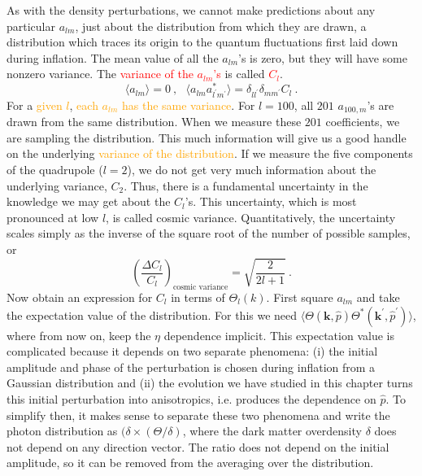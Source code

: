 \documentclass[12pt,a4paper]{article}
\renewcommand{\vec}[1]{\boldsymbol{#1}}
\begin{document}
As with the density perturbations, we cannot make predictions about any particular $a_{lm}$, just about the distribution from which they are drawn, a distribution which traces its origin to the quantum fluctuations first laid down during inflation. The mean value of all the $a_{lm}$'s is zero, but they will have some nonzero variance. The \textcolor{red}{variance of the $a_{lm}$'s} is called \textcolor{red}{$C_l$}. 
\begin{equation}
\langle a_{lm} \rangle = 0 ~, ~~~ \langle a_{lm} a_{l^\prime m^\prime}^\ast \rangle = \delta_{l l^\prime}\delta_{m m^\prime} C_l ~.
\end{equation}
For a \textcolor{orange}{given $l$}, \textcolor{orange}{each $a_{lm}$ has the same variance}. For $l = 100$, all $201$ $a_{100,m}$'s are drawn from the same distribution. When we measure these $201$ coefficients, we are sampling the distribution. This much information will give us a good handle on the underlying \textcolor{orange}{variance of the distribution}. If we measure the five components of the quadrupole ($l = 2$), we do not get very much information about the underlying variance, $C_2$. Thus, there is a fundamental uncertainty in the knowledge we may get about the $C_l$'s. This uncertainty, which is most pronounced at low $l$, is called cosmic variance. Quantitatively, the uncertainty scales simply as the inverse of the square root of the number of possible samples, or 
\begin{equation}
\left(\dfrac{\Delta C_l}{C_l} \right)_{\text{cosmic variance} } = \sqrt{\dfrac{2}{2l+1}} ~.
\end{equation}
Now obtain an expression for $C_l$ in terms of $\Theta_l(k)$. First square $a_{lm}$ and take the expectation value of the distribution. For this we need $\langle \Theta(\vec{k}, \hat{p})\Theta^\ast(\vec{k}^\prime, \hat{p}^\prime) \rangle$, where from now on, keep the $\eta$ dependence implicit. This expectation value is complicated because it depends on two separate phenomena: (i) the initial amplitude and phase of the perturbation is chosen during inflation from a Gaussian distribution and (ii) the evolution we have studied in this chapter turns this initial perturbation into anisotropics, i.e. produces the dependence on $\hat{p}$. To simplify then, it makes sense to separate these two phenomena and write the photon distribution as $(\delta \times (\Theta/\delta)$, where the dark matter overdensity $\delta$ does not depend on any direction vector. The ratio does not depend on the initial amplitude, so it can be removed from the averaging over the distribution. 
\end{document}
